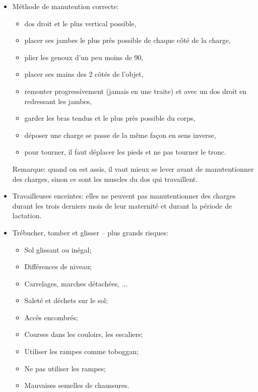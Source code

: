 \documentclass[a4paper]{article}
\begin{document}
\begin{itemize}
\item Méthode de manutention correcte:
\begin{itemize}
    \item dos droit et le plus vertical possible,
    \item placer ses jambes le plus près possible de chaque côté de la charge,
    \item plier les genoux d’un peu moins de 90\textdegree,
    \item placer ses mains des 2 côtés de l'objet,
    \item remonter progressivement (jamais en une traite) et avec un dos droit en redressant les jambes,
    \item garder les bras tendus et le plus près possible du corps,
    \item déposer une charge se passe de la même façon en sens inverse,
    \item pour tourner, il faut déplacer les pieds et ne pas tourner le tronc.
\end{itemize}
Remarque: quand on est assis, il vaut mieux se lever avant de manutentionner des charges, sinon ce sont les muscles du dos qui travaillent.





\item Travailleuses enceintes: elles ne peuvent pas manutentionner des charges durant les trois derniers mois de leur maternité et durant la période de lactation.





\item Trébucher, tomber et glisser -- plus grands risques:
\begin{itemize}
    \item Sol glissant ou inégal;
    \item Différences de niveau;
    \item Carrelages, marches détachées, ...
    \item Saleté et déchets sur le sol;
    \item Accès encombrés;
    \item Courses dans les couloirs, les escaliers;
    \item Utiliser les rampes comme toboggan;
    \item Ne pas utiliser les rampes;
    \item Mauvaises semelles de chaussures.
\end{itemize}






\end{itemize}
\end{document}
